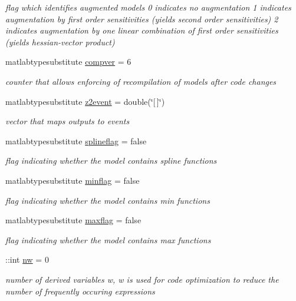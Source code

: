 \begin{DoxyCompactItemize}
\begin{DoxyCompactList}\small\item\em flag which identifies augmented models 0 indicates no augmentation 1 indicates augmentation by first order sensitivities (yields second order sensitivities) 2 indicates augmentation by one linear combination of first order sensitivities (yields hessian-\/vector product) \end{DoxyCompactList}\item 
matlabtypesubstitute \hyperlink{classamimodel_a0a9e4caf628a02e6db68e91c2de6f382}{compver} = 6
\begin{DoxyCompactList}\small\item\em counter that allows enforcing of recompilation of models after code changes \end{DoxyCompactList}\item 
matlabtypesubstitute \hyperlink{classamimodel_a7a7be015feeb7a346dceccd49e622b4b}{z2event} = double(\char`\"{}\mbox{[}$\,$\mbox{]}\char`\"{})
\begin{DoxyCompactList}\small\item\em vector that maps outputs to events \end{DoxyCompactList}\item 
matlabtypesubstitute \hyperlink{classamimodel_abea45d67286ebbf35dcbc12e335ffd51}{splineflag} = false
\begin{DoxyCompactList}\small\item\em flag indicating whether the model contains spline functions \end{DoxyCompactList}\item 
matlabtypesubstitute \hyperlink{classamimodel_affead4b7a87bc135fea91fd5aada78a8}{minflag} = false
\begin{DoxyCompactList}\small\item\em flag indicating whether the model contains min functions \end{DoxyCompactList}\item 
matlabtypesubstitute \hyperlink{classamimodel_a1a65e7157ae2262cfa11a783b018364f}{maxflag} = false
\begin{DoxyCompactList}\small\item\em flag indicating whether the model contains max functions \end{DoxyCompactList}\item 
\+::int \hyperlink{classamimodel_a371815f74d602ff1338376abbd1278e4}{nw} = 0
\begin{DoxyCompactList}\small\item\em number of derived variables w, w is used for code optimization to reduce the number of frequently occuring expressions \end{DoxyCompactList}\item 

\end{DoxyCompactItemize}
